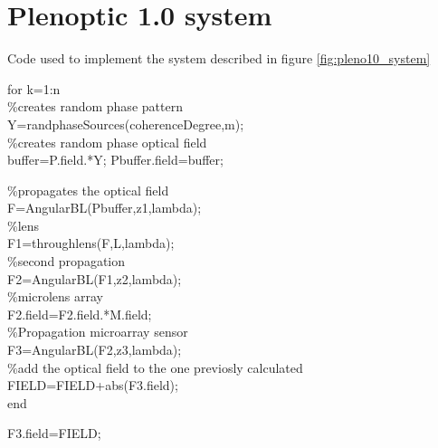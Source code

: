 \section*{Plenoptic 1.0 system}
Code used to implement the system described in figure \ref{fig:pleno10_system}\\
\begin{listing}
for k=1:n
\\
\%creates random phase pattern\\
Y=randphaseSources(coherenceDegree,m);\\

\%creates random phase optical field
\\
buffer=P.field.*Y;
Pbuffer.field=buffer;

\%propagates the optical field \\
F=AngularBL(Pbuffer,z1,lambda);\\

\%lens \\
F1=throughlens(F,L,lambda);\\

\%second propagation \\
F2=AngularBL(F1,z2,lambda);\\

\%microlens array\\
F2.field=F2.field.*M.field;\\

\%Propagation microarray sensor\\
F3=AngularBL(F2,z3,lambda);\\

\%add the optical field to the one previosly calculated\\
FIELD=FIELD+abs(F3.field);\\


end


F3.field=FIELD;	
\end{listing}

